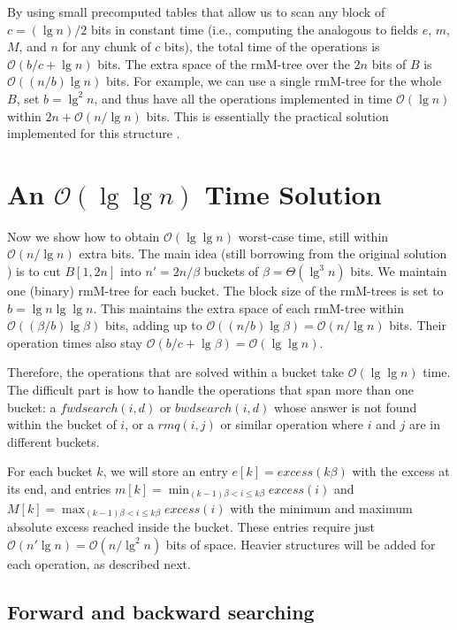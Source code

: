 \documentclass[11pt]{article}
\renewcommand{\log}{\lg}
\newcommand{\0}{\mathit{0}}
\newcommand{\1}{\mathit{1}}
\newcommand{\excess}{\mathit{excess}}
\newcommand{\fwdsearch}{\mathit{fwdsearch}}
\newcommand{\bwdsearch}{\mathit{bwdsearch}}
\newcommand{\rmq}{\mathit{rmq}}
\newcommand{\Oh}[1]{\mathcal{O}\!\left(#1\right)}
\begin{document}
By using small precomputed tables that allow us to scan any block of 
$c=(\log n)/2$ bits in constant time (i.e., computing the analogous to fields
$e$, $m$, $M$, and $n$ for any chunk of $c$ bits), the total time of the
operations is $\Oh{b/c + \log n}$ bits. The extra space of the rmM-tree over 
the $2n$ bits of $B$ is $\Oh{(n/b)\log n}$ bits. For example, we can use a
single rmM-tree for the whole $B$, set $b=\log^2 n$, and thus have all the
operations implemented in time $\Oh{\log n}$ within $2n+\Oh{n/\log n}$ bits.
This is essentially the practical solution implemented for this structure
\cite{ACNS10}.

\section{An $\Oh{\log\log n}$ Time Solution} 

Now we show how to obtain $\Oh{\log\log n}$ worst-case time, still within
$\Oh{n/\log n}$ extra bits. The main idea (still borrowing from the original
solution \cite{NS14}) is to cut $B[1,2n]$ into $n'=2n/\beta$ buckets of 
$\beta = \Theta(\log^3 n)$ bits. We maintain one (binary) rmM-tree for each 
bucket. The block size of the rmM-trees is set to $b=\log n \log\log n$. 
This maintains the extra space of each rmM-tree within
$\Oh{(\beta/b)\log\beta}$ bits, adding up to $\Oh{(n/b)\log\beta}=\Oh{n/\log n}$
bits. Their operation times also stay $\Oh{b/c+\log\beta}=\Oh{\log\log n}$.

Therefore, the operations that are solved within a bucket take $\Oh{\log\log n}$
time.  The difficult part is how to handle the operations that span more than 
one bucket: a $\fwdsearch(i,d)$ or $\bwdsearch(i,d)$ whose answer is not found
within the bucket of $i$, or a $\rmq(i,j)$ or similar operation where $i$
and $j$ are in different buckets.

For each bucket $k$, we will store an entry $e[k]=\excess(k\beta)$ with the
excess at its end, and entries $m[k]=\min_{(k-1)\beta <i \le k\beta}
\excess(i)$ and $M[k]=\max_{(k-1)\beta <i \le k\beta}
\excess(i)$ with the minimum and maximum absolute excess reached inside the
bucket. These entries require just $\Oh{n'\log n}=\Oh{n/\log^2 n}$ bits of 
space. Heavier structures will be added for each operation, as described next.

\subsection{Forward and backward searching}  \label{sec:fwd-large}
\end{document}
